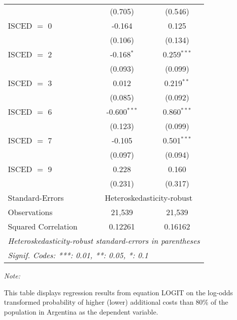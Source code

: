 \begin{table}[htbp!]
\begin{adjustbox}{width = 1\textwidth, max height = 0.95\textheight, center}
\begin{threeparttable}[b]
\begin{tabular}{lcc}
                                 & (0.705)        & (0.546)\\   
            ISCED $=$ 0          & -0.164         & 0.125\\   
                                 & (0.106)        & (0.134)\\   
            ISCED $=$ 2          & -0.168$^{*}$   & 0.259$^{***}$\\   
                                 & (0.093)        & (0.099)\\   
            ISCED $=$ 3          & 0.012          & 0.219$^{**}$\\   
                                 & (0.085)        & (0.092)\\   
            ISCED $=$ 6          & -0.600$^{***}$ & 0.860$^{***}$\\   
                                 & (0.123)        & (0.099)\\   
            ISCED $=$ 7          & -0.105         & 0.501$^{***}$\\   
                                 & (0.097)        & (0.094)\\   
            ISCED $=$ 9          & 0.228          & 0.160\\   
                                 & (0.231)        & (0.317)\\   
            \midrule 
            Standard-Errors & \multicolumn{2}{c}{Heteroskedasticity-robust} \\ 
            Observations         & 21,539         & 21,539\\  
            Squared Correlation  & 0.12261        & 0.16162\\  
            \midrule \midrule
            \multicolumn{3}{l}{\emph{Heteroskedasticity-robust standard-errors in parentheses}}\\
            \multicolumn{3}{l}{\emph{Signif. Codes: ***: 0.01, **: 0.05, *: 0.1}}\\
         \end{tabular}
         
         \begin{tablenotes}\item \medskip \textit{Note:}
            \item This table displays regression results from equation LOGIT on the log-odds transformed probability of higher (lower) additional costs than 80\% of the population in Argentina as the dependent variable. 
         \end{tablenotes}
      \end{threeparttable}
   \end{adjustbox}
\end{table}


